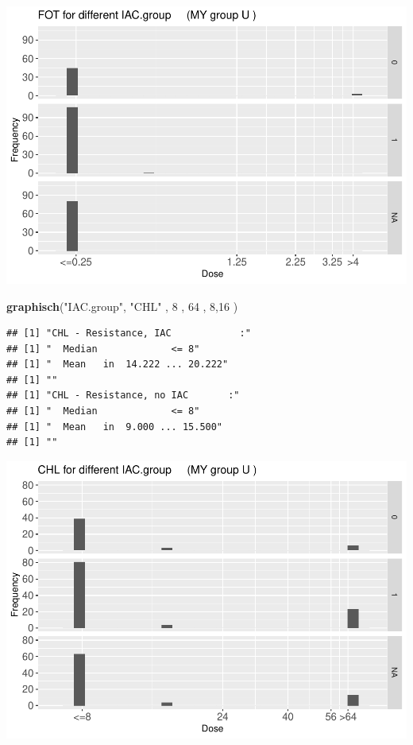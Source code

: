 \documentclass[
]{article}
\newenvironment{Shaded}{\begin{snugshade}}{\end{snugshade}}
\newcommand{\DecValTok}[1]{\textcolor[rgb]{0.00,0.00,0.81}{#1}}
\newcommand{\KeywordTok}[1]{\textcolor[rgb]{0.13,0.29,0.53}{\textbf{#1}}}
\newcommand{\NormalTok}[1]{#1}
\newcommand{\StringTok}[1]{\textcolor[rgb]{0.31,0.60,0.02}{#1}}
\begin{document}
\includegraphics{Verteilungen_files/figure-latex/unnamed-chunk-12-1.pdf}

\begin{Shaded}
\begin{Highlighting}[]
   \KeywordTok{graphisch}\NormalTok{(}\StringTok{"IAC.group"}\NormalTok{, }\StringTok{"CHL"}\NormalTok{ , }\DecValTok{8}\NormalTok{    ,  }\DecValTok{64}\NormalTok{   ,   }\DecValTok{8}\NormalTok{,}\DecValTok{16}\NormalTok{   ) }
\end{Highlighting}
\end{Shaded}

\begin{verbatim}
## [1] "CHL - Resistance, IAC            :"
## [1] "  Median             <= 8"
## [1] "  Mean   in  14.222 ... 20.222"
## [1] ""
## [1] "CHL - Resistance, no IAC       :"
## [1] "  Median             <= 8"
## [1] "  Mean   in  9.000 ... 15.500"
## [1] ""
\end{verbatim}

\includegraphics{Verteilungen_files/figure-latex/unnamed-chunk-13-1.pdf}
\end{document}
